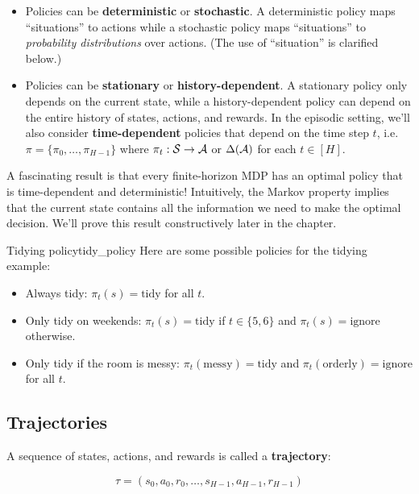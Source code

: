 \documentclass[../main/main]{subfiles}
\begin{document}
\begin{itemize}
    \item Policies can be \textbf{deterministic} or \textbf{stochastic}. A deterministic policy maps ``situations'' to actions while a stochastic policy maps ``situations'' to \emph{probability distributions} over actions. (The use of ``situation'' is clarified below.)
    \item Policies can be \textbf{stationary} or \textbf{history-dependent}. A stationary policy only depends on the current state, while a history-dependent policy can depend on the entire history of states, actions, and rewards. In the episodic setting, we'll also consider \textbf{time-dependent} policies that depend on the time step $t$, i.e. $\pi = \{ \pi_0, \dots, \pi_{H-1} \}$ where $\pi_t : \mathcal{S} \to \mathcal{A}$ or $\Delta(\mathcal{A})$ for each $t \in [H]$.
\end{itemize}

A fascinating result is that every finite-horizon MDP has an optimal policy that is time-dependent and deterministic! Intuitively, the Markov property implies that the current state contains all the information we need to make the optimal decision. We'll prove this result constructively later in the chapter.


\begin{example}{Tidying policy}{tidy_policy}
    Here are some possible policies for the tidying example:

    \begin{itemize}
        \item Always tidy: $\pi_t(s) = \text{tidy}$ for all $t$.
        \item Only tidy on weekends: $\pi_t(s) = \text{tidy}$ if $t \in \{ 5, 6 \}$ and $\pi_t(s) = \text{ignore}$ otherwise.
        \item Only tidy if the room is messy: $\pi_t(\text{messy}) = \text{tidy}$ and $\pi_t(\text{orderly}) = \text{ignore}$ for all $t$.
    \end{itemize}
\end{example}

\subsection{Trajectories}

A sequence of states, actions, and rewards is called a \textbf{trajectory}:

\[
    \tau = (s_0, a_0, r_0, \dots, s_{H-1}, a_{H-1}, r_{H-1})
\]
\end{document}
